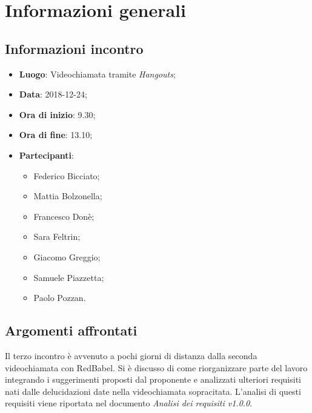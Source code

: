 \section{Informazioni generali}

\subsection{Informazioni incontro}
\begin{itemize}
\item \textbf{Luogo}: Videochiamata tramite \textit{Hangouts};
\item \textbf{Data}: 2018-12-24;
\item \textbf{Ora di inizio}: 9.30;
\item \textbf{Ora di fine}: 13.10;
\item \textbf{Partecipanti}:
\begin{itemize}
	\item Federico Bicciato;
	\item Mattia Bolzonella;
	\item Francesco Donè;
	\item Sara Feltrin;
	\item Giacomo Greggio;
	\item Samuele Piazzetta;
	\item Paolo Pozzan.
\end{itemize}
\end{itemize}

\subsection{Argomenti affrontati}
Il terzo incontro è avvenuto a pochi giorni di distanza dalla seconda videochiamata
con RedBabel. Si è discusso di come riorganizzare parte del lavoro integrando 
i suggerimenti proposti dal proponente e analizzati ulteriori requisiti nati dalle
delucidazioni date nella videochiamata sopracitata. L'analisi di questi requisiti 
viene riportata nel documento \textit{Analisi dei requisiti v1.0.0}.
